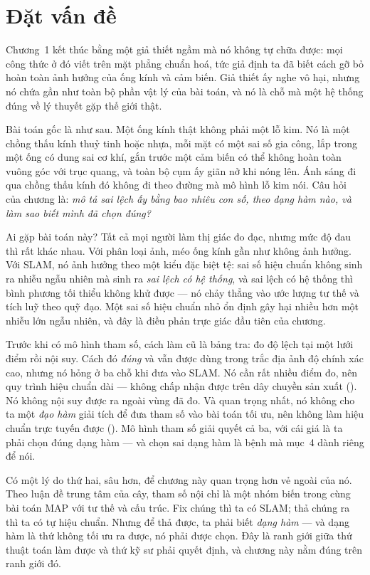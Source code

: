 \documentclass[../../vslam.tex]{subfiles}
\begin{document}
\section{Đặt vấn đề}

Chương~1 kết thúc bằng một giả thiết ngầm mà nó không tự chữa được: mọi công thức ở đó viết trên mặt phẳng chuẩn hoá, tức giả định ta đã biết cách gỡ bỏ hoàn toàn ảnh hưởng của ống kính và cảm biến. Giả thiết ấy nghe vô hại, nhưng nó chứa gần như toàn bộ phần vật lý của bài toán, và nó là chỗ mà một hệ thống đúng về lý thuyết gặp thế giới thật.

Bài toán gốc là như sau. Một ống kính thật không phải một lỗ kim. Nó là một chồng thấu kính thuỷ tinh hoặc nhựa, mỗi mặt có một sai số gia công, lắp trong một ống có dung sai cơ khí, gắn trước một cảm biến có thể không hoàn toàn vuông góc với trục quang, và toàn bộ cụm ấy giãn nở khi nóng lên. Ánh sáng đi qua chồng thấu kính đó không đi theo đường mà mô hình lỗ kim nói. Câu hỏi của chương là: \emph{mô tả sai lệch ấy bằng bao nhiêu con số, theo dạng hàm nào, và làm sao biết mình đã chọn đúng?}

Ai gặp bài toán này? Tất cả mọi người làm thị giác đo đạc, nhưng mức độ đau thì rất khác nhau. Với phân loại ảnh, méo ống kính gần như không ảnh hưởng. Với SLAM, nó ảnh hưởng theo một kiểu đặc biệt tệ: sai số hiệu chuẩn không sinh ra nhiễu ngẫu nhiên mà sinh ra \emph{sai lệch có hệ thống}, và sai lệch có hệ thống thì bình phương tối thiểu không khử được --- nó chảy thẳng vào ước lượng tư thế và tích luỹ theo quỹ đạo. Một sai số hiệu chuẩn nhỏ ổn định gây hại nhiều hơn một nhiễu lớn ngẫu nhiên, và đây là điều phản trực giác đầu tiên của chương.

Trước khi có mô hình tham số, cách làm cũ là bảng tra: đo độ lệch tại một lưới điểm rồi nội suy. Cách đó \emph{đúng} và vẫn được dùng trong trắc địa ảnh độ chính xác cao, nhưng nó hỏng ở ba chỗ khi đưa vào SLAM. Nó cần rất nhiều điểm đo, nên quy trình hiệu chuẩn dài --- không chấp nhận được trên dây chuyền sản xuất (). Nó không nội suy được ra ngoài vùng đã đo. Và quan trọng nhất, nó không cho ta một \emph{đạo hàm} giải tích để đưa tham số vào bài toán tối ưu, nên không làm hiệu chuẩn trực tuyến được (). Mô hình tham số giải quyết cả ba, với cái giá là ta phải chọn đúng dạng hàm --- và chọn sai dạng hàm là bệnh mà mục~4 dành riêng để nói.

Có một lý do thứ hai, sâu hơn, để chương này quan trọng hơn vẻ ngoài của nó. Theo luận đề trung tâm của cây, tham số nội chỉ là một nhóm biến trong cùng bài toán MAP với tư thế và cấu trúc. Fix chúng thì ta có SLAM; thả chúng ra thì ta có tự hiệu chuẩn. Nhưng để thả được, ta phải biết \emph{dạng hàm} --- và dạng hàm là thứ không tối ưu ra được, nó phải được chọn. Đây là ranh giới giữa thứ thuật toán làm được và thứ kỹ sư phải quyết định, và chương này nằm đúng trên ranh giới đó.
\end{document}
